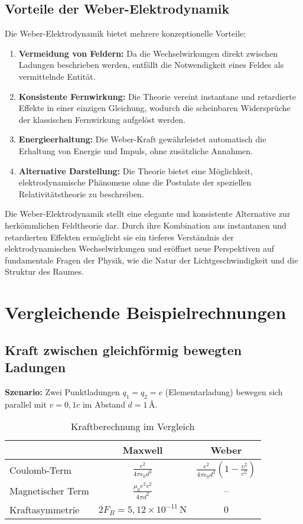 \subsection{Vorteile der Weber-Elektrodynamik}
Die Weber-Elektrodynamik bietet mehrere konzeptionelle Vorteile:
\begin{enumerate}
    \item \textbf{Vermeidung von Feldern:} Da die Wechselwirkungen direkt zwischen Ladungen beschrieben werden, entfällt die Notwendigkeit eines Feldes als vermittelnde Entität.
    \item \textbf{Konsistente Fernwirkung:} Die Theorie vereint instantane und retardierte Effekte in einer einzigen Gleichung, wodurch die scheinbaren Widersprüche der klassischen Fernwirkung aufgelöst werden.
    \item \textbf{Energieerhaltung:} Die Weber-Kraft gewährleistet automatisch die Erhaltung von Energie und Impuls, ohne zusätzliche Annahmen.
    \item \textbf{Alternative Darstellung:} Die Theorie bietet eine Möglichkeit, elektrodynamische Phänomene ohne die Postulate der speziellen Relativitätstheorie zu beschreiben.
\end{enumerate}

Die Weber-Elektrodynamik stellt eine elegante und konsistente Alternative zur herkömmlichen Feldtheorie dar. Durch ihre Kombination aus instantanen und retardierten Effekten ermöglicht
sie ein tieferes Verständnis der elektrodynamischen Wechselwirkungen und eröffnet neue Perspektiven auf fundamentale Fragen der Physik, wie die Natur der Lichtgeschwindigkeit und die Struktur
des Raumes.

\section{Vergleichende Beispielrechnungen}
\subsection{Kraft zwischen gleichförmig bewegten Ladungen}

\textbf{Szenario:} Zwei Punktladungen $q_1 = q_2 = e$ (Elementarladung) bewegen sich parallel mit $v = 0,\!1c$ im Abstand $d = 1\,\text{\AA}$.

\begin{table}[ht]
\centering
\caption{Kraftberechnung im Vergleich}
\begin{tabular}{lcc}
\toprule
 & \textbf{Maxwell} & \textbf{Weber} \\
\midrule
Coulomb-Term & $\displaystyle\frac{e^2}{4\pi\epsilon_0 d^2}$ & $\displaystyle\frac{e^2}{4\pi\epsilon_0 d^2}\left(1-\frac{v^2}{c^2}\right)$ \\
Magnetischer Term & $\displaystyle\frac{\mu_0 e^2 v^2}{4\pi d^2}$ & -- \\
\hline
Kraftasymmetrie & $2F_B = 5,\!12\times10^{-11}\,\text{N}$ & $0$ \\
\bottomrule
\end{tabular}
\end{table}


